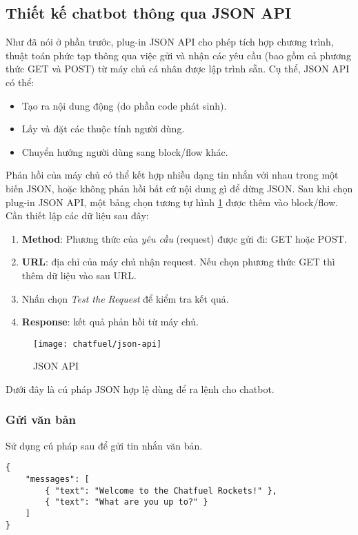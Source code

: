 \subsection{Thiết kế chatbot thông qua JSON API}
Như đã nói ở phần trước, plug-in JSON API cho phép tích hợp chương trình, thuật toán phức tạp thông qua việc gửi và nhận các yêu cầu (bao gồm cả phương thức GET và POST) từ máy chủ cá nhân được lập trình sẵn. Cụ thể, JSON API có thể:\begin{itemize}
	\item Tạo ra nội dung động (do phần code phát sinh).
	\item Lấy và đặt các thuộc tính người dùng.
	\item Chuyển hướng người dùng sang block/flow khác.
\end{itemize}\par
Phản hồi của máy chủ có thể kết hợp nhiều dạng tin nhắn với nhau trong một biến JSON, hoặc không phản hồi bất cứ nội dung gì để dừng JSON. Sau khi chọn plug-in JSON API, một bảng chọn tương tự hình \ref{fig:fig-c3-json-api} được thêm vào block/flow. Cần thiết lập các dữ liệu sau đây: \begin{enumerate}[label=\textbf{(\arabic*)},align=left,left=0cm..0cm,itemindent=*]
	\item \textbf{Method}: Phương thức của \textit{yêu cầu} (request) được gửi đi: GET hoặc POST.
	\item \textbf{URL}: địa chỉ của máy chủ nhận request. Nếu chọn phương thức GET thì thêm dữ liệu vào sau URL.
	\item Nhấn chọn \textit{Test the Request} để kiểm tra kết quả.
	\item \textbf{Response}: kết quả phản hồi từ máy chủ.
\end{enumerate}\par

\begin{figure}[htb!]\centering
	\texttt{[image: chatfuel/json-api]}
	\caption{JSON API}
	\label{fig:fig-c3-json-api}
\end{figure}\par

Dưới đây là cú pháp JSON hợp lệ dùng để ra lệnh cho chatbot.
\subsubsection{Gửi văn bản}
Sử dụng cú pháp sau để gửi tin nhắn văn bản.
\begin{lstlisting}
{
	"messages": [
		{ "text": "Welcome to the Chatfuel Rockets!" },
		{ "text": "What are you up to?" }
	]
}
\end{lstlisting}\par

